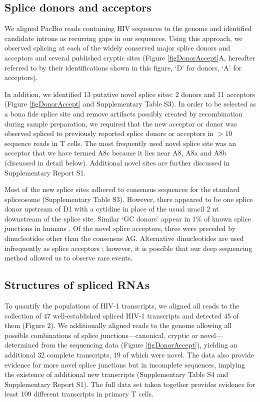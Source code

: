 \documentclass[../sherrill-Mix_thesis.tex]{subfiles}
\begin{document}
\subsection{Splice donors and acceptors}
We aligned PacBio reads containing HIV sequences to the \hivEight{} genome and identified candidate introns as recurring gaps in our sequences. Using this approach, we observed splicing at each of the widely conserved major splice donors and acceptors and several published cryptic sites (Figure \ref{figDonorAccept}A, hereafter referred to by their identifications shown in this figure, `D' for donors, `A' for acceptors).

In addition, we identified 13 putative novel splice sites: 2 donors and 11 acceptors (Figure \ref{figDonorAccept} and Supplementary Table S3). In order to be selected as a bona fide splice site and remove artifacts possibly created by recombination during sample preparation, we required that the new acceptor or donor was observed spliced to previously reported splice donors or acceptors in $>10$ sequence reads in \cdFour{} T cells. The most frequently used novel splice site was an acceptor that we have termed A8c because it lies near A8, A8a and A8b (discussed in detail below). Additional novel sites are further discussed in Supplementary Report S1.

Most of the new splice sites adhered to consensus sequences for the standard spliceosome (Supplementary Table S3). However, there appeared to be one splice donor upstream of D1 with a cytidine in place of the usual uracil 2 nt downstream of the splice site. Similar `GC donors' appear in 1\% of known splice junctions in humans \citep{Thanaraj2001}. Of the novel splice acceptors, three were preceded by dinucleotides other than the consensus AG. Alternative dinucleotides are used infrequently as splice acceptors \citep{Aebi1986,Burset2000,Burset2001,Sheth2006}; however, it is possible that our deep sequencing method allowed us to observe rare events. 


\subsection{Structures of spliced \hivEight{} RNAs}
To quantify the populations of HIV-1 transcripts, we aligned all reads to the collection of 47 well-established spliced HIV-1 transcripts and detected 45 of them (Figure 2). We additionally aligned reads to the \hivEight{} genome allowing all possible combinations of splice junctions---canonical, cryptic or novel---determined from the sequencing data (Figure \ref{figDonorAccept}), yielding an additional 32 complete transcripts, 19 of which were novel. The data also provide evidence for more novel splice junctions but in incomplete sequences, implying the existence of additional new transcripts (Supplementary Table S4 and Supplementary Report S1). The full data set taken together provides evidence for least 109 different \hivEight{} transcripts in primary T cells.
\end{document}
